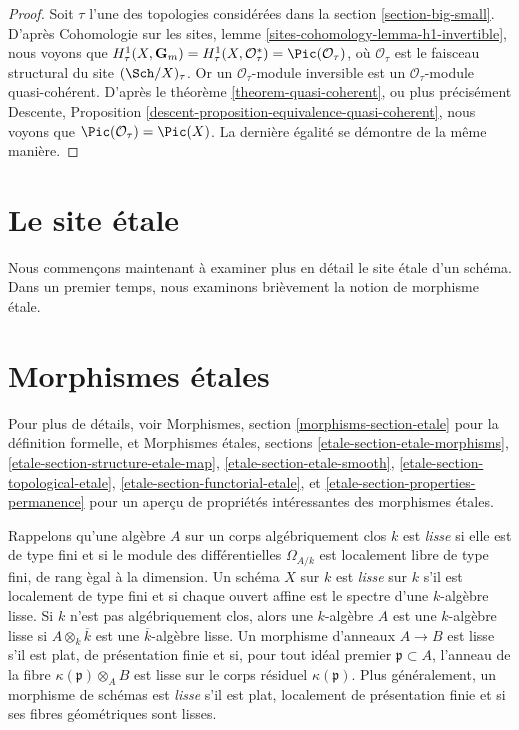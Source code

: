 \begin{proof}
Soit $\tau$ l'une des topologies consid\'er\'ees dans la
section \ref{section-big-small}.
D'apr\`es
Cohomologie sur les sites, lemme
\ref{sites-cohomology-lemma-h1-invertible},
nous voyons que
$H^1_\tau(X, \mathbf{G}_m) =
H^1_\tau(X, \mathcal{O}_\tau^*) =
\Pic(\mathcal{O}_\tau)$,
o\`u $\mathcal{O}_\tau$ est le faisceau structural du site
$(\Sch/X)_\tau$. Or un $\mathcal{O}_\tau$-module inversible
est un $\mathcal{O}_\tau$-module quasi-coh\'erent.
D'apr\`es le th\'eor\`eme \ref{theorem-quasi-coherent}, ou plus pr\'ecis\'ement
Descente, Proposition \ref{descent-proposition-equivalence-quasi-coherent},
nous voyons que $\Pic(\mathcal{O}_\tau) = \Pic(X)$.
La derni\`ere \'egalit\'e se d\'emontre de la m\^eme mani\`ere.
\end{proof}






\section{Le site \'etale}
\label{section-etale-site}

\noindent
Nous commen\c{c}ons maintenant \`a examiner plus en d\'etail le site \'etale d'un
sch\'ema. Dans un premier temps, nous examinons bri\`evement la notion de
morphisme \'etale.





\section{Morphismes \'etales}
\label{section-etale-morphism}

\noindent
Pour plus de d\'etails, voir
Morphismes, section \ref{morphisms-section-etale}
pour la d\'efinition formelle, et
Morphismes étales, sections
\ref{etale-section-etale-morphisms},
\ref{etale-section-structure-etale-map},
\ref{etale-section-etale-smooth},
\ref{etale-section-topological-etale},
\ref{etale-section-functorial-etale}, et
\ref{etale-section-properties-permanence}
pour un aper\c{c}u de propri\'et\'es int\'eressantes des morphismes \'etales.

\medskip\noindent
Rappelons qu'une alg\`ebre $A$ sur un corps alg\'ebriquement clos $k$ est
{\it lisse} si elle est de type fini et si le module des diff\'erentielles
$\Omega_{A/k}$ est localement libre de type fini, de rang \`egal \`a la dimension.
Un sch\'ema $X$ sur $k$ est {\it lisse} sur $k$ s'il est localement de type
fini et si chaque ouvert affine est le spectre d'une $k$-alg\`ebre lisse.
Si $k$ n'est pas alg\'ebriquement clos, alors une $k$-alg\`ebre $A$ est
une $k$-alg\`ebre lisse si $A \otimes_k \overline{k}$ est une
$\overline{k}$-alg\`ebre lisse. Un morphisme d'anneaux $A \to B$ est lisse s'il est
plat, de pr\'esentation finie et si, pour tout id\'eal premier $\mathfrak p \subset A$,
l'anneau de la fibre $\kappa(\mathfrak p) \otimes_A B$ est lisse sur le corps
r\'esiduel $\kappa(\mathfrak p)$. Plus g\'en\'eralement, un morphisme de sch\'emas est
{\it lisse} s'il est plat, localement de pr\'esentation finie et si ses
fibres g\'eom\'etriques sont lisses.

